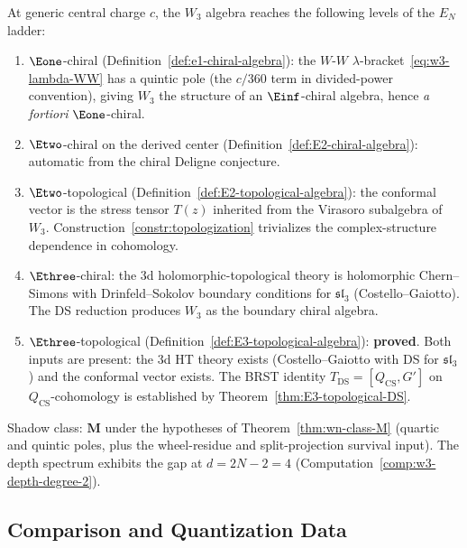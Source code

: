 \begin{remark}
\label{rem:w3-EN-level}
At generic central charge $c$, the $W_3$ algebra reaches the
following levels of the $E_N$ ladder:
\begin{enumerate}[label=\textup{(\roman*)}]
\item $\Eone$-chiral
 (Definition~\ref{def:e1-chiral-algebra}): the $W$-$W$
 $\lambda$-bracket~\eqref{eq:w3-lambda-WW} has a quintic
 pole (the $c/360$ term in divided-power convention),
 giving $W_3$ the structure of an $\Einf$-chiral algebra,
 hence \emph{a fortiori} $\Eone$-chiral.

\item $\Etwo$-chiral on the derived center
 (Definition~\ref{def:E2-chiral-algebra}): automatic from
 the chiral Deligne conjecture.

\item $\Etwo$-topological
 (Definition~\ref{def:E2-topological-algebra}): the
 conformal vector is the stress tensor $T(z)$ inherited
 from the Virasoro subalgebra of $W_3$.
 Construction~\ref{constr:topologization} trivializes the
 complex-structure dependence in cohomology.

\item $\Ethree$-chiral: the 3d holomorphic-topological
 theory is holomorphic Chern--Simons with
 Drinfeld--Sokolov boundary conditions for
 $\mathfrak{sl}_3$ (Costello--Gaiotto). The DS reduction
 produces $W_3$ as the boundary chiral algebra.

\item $\Ethree$-topological
 (Definition~\ref{def:E3-topological-algebra}):
 \textbf{proved}. Both inputs are present: the 3d
 HT theory exists (Costello--Gaiotto with DS for
 $\mathfrak{sl}_3$) and the conformal vector exists.
 The BRST identity
 $T_{\mathrm{DS}} = [Q_{\mathrm{CS}}, G']$ on
 $Q_{\mathrm{CS}}$-cohomology is established by
 Theorem~\ref{thm:E3-topological-DS}.
\end{enumerate}
Shadow class: $\mathbf{M}$ under the hypotheses of
Theorem~\ref{thm:wn-class-M} (quartic and quintic poles, plus the
wheel-residue and split-projection survival input). The
depth spectrum exhibits the gap at $d = 2N - 2 = 4$
(Computation~\ref{comp:w3-depth-degree-2}).
\end{remark}

\subsection{Comparison and Quantization Data}
\label{subsec:quantization}

